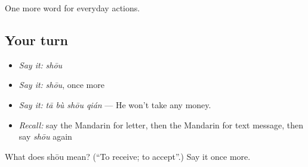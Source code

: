 \begin{grammarlens}[title={What you've built}]
One more word for everyday actions.
\end{grammarlens}

\subsection*{Your turn}
\begin{itemize}
\raggedright
  \item \emph{Say it:} \emph{shōu}
  \item \emph{Say it:} \emph{shōu}, once more
  \item \emph{Say it:} \emph{tā bù shōu qián} — He won't take any money.
  \item \emph{Recall:} say the Mandarin for letter, then the Mandarin for text message, then say \emph{shōu} again
\end{itemize}

\begin{tcolorbox}[breakable,colback=teal!4,colframe=teal!35!black,title={Before you move on}]
What does shōu mean? (\textquotedblleft{}To receive; to accept\textquotedblright{}.) Say it once more.
\end{tcolorbox}
